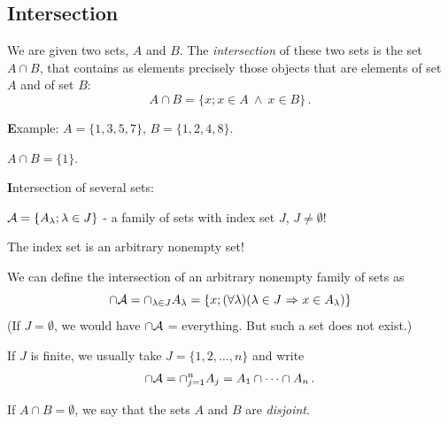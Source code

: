 \documentclass[11pt,paper=b5,footinclude,headinclude]{scrbook} %
\def\ali {{~\vee~}}
\def\inn {{~\wedge~}}
\def\sledi {{~\Rightarrow~}}
\theoremstyle{remark}
\theoremstyle{definition} %
\begin{document}
%
%
%
%
%
%
%
%
%
%
%
%
%
%
%
%
%
%
%
%
%
%
%
%
%
%


\subsection{Intersection}
We are given two sets, $A$ and $B$. The {\em intersection} of these two sets is the set $A\cap B$,
that contains as elements precisely those objects that are elements of set $A$ and of set $B$:
$$A\cap B = \{x; x\in A \inn x\in B\}\,.$$

{\textbf Example:}
$A = \{1,3,5,7\}$, $B = \{1,2,4,8\}$.

$A\cap B = \{1\}$.

\medskip

{\textbf Intersection of several sets}:

${\cal A} = \{A_\lambda; \lambda \in J\}$ - a family of sets with index set $J$, $J\neq \emptyset$!

The index set is an arbitrary nonempty set!

We can define the intersection of an arbitrary nonempty family of sets as
$$\cap {\cal A} = \cap_{\lambda \in J} A_\lambda = \{x;(\forall\lambda) (\lambda \in J\sledi x\in A_\lambda)\}$$
(If $J = \emptyset$, we would have $\cap {\cal A}$ = everything. But such a set does not exist.)

\medskip
If $J$ is finite, we usually take $J = \{1,2,\ldots, n\}$ and write
$$\cap {\cal A} = \cap_{j = 1}^nA_j = A_1\cap\cdots\cap A_n\,.$$

If $A\cap B = \emptyset$, we say that the sets $A$ and $B$ are {\em disjoint}.
\end{document}
